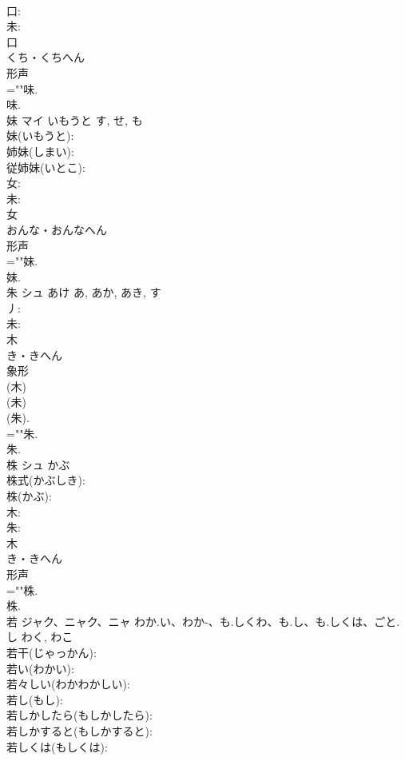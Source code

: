 \documentclass[8pt]{extreport}
\begin{document}
\begin{CJK}{UTF8}{min}
\\	口: 
\\	未: 
\\	口	
\\	くち・くちへん	
\\	形声 
\\	=""味.
\\	味.
\\	妹	マイ	いもうと	す, せ, も	
\\	妹(いもうと): 
\\	姉妹(しまい): 
\\	従姉妹(いとこ): 
\\	女: 
\\	未: 
\\	女	
\\	おんな・おんなへん	
\\	形声 
\\	=""妹.
\\	妹.
\\	朱	シュ	あけ	あ, あか, あき, す	
\\	丿: 
\\	未: 
\\	木	
\\	き・きへん	
\\	象形 
\\	(木) 
\\	(未)
\\	(朱).	
\\	=""朱.
\\	朱.
\\	株	シュ	かぶ		
\\	株式(かぶしき): 
\\	株(かぶ): 
\\	木: 
\\	朱: 
\\	木	
\\	き・きへん	
\\	形声 
\\	=""株.
\\	株.
\\	若	ジャク、ニャク、ニャ	わか.い、わか-、も.しくわ、も.し、も.しくは、ごと.し	わく, わこ	
\\	若干(じゃっかん): 
\\	若い(わかい): 
\\	若々しい(わかわかしい): 
\\	若し(もし): 
\\	若しかしたら(もしかしたら): 
\\	若しかすると(もしかすると): 
\\	若しくは(もしくは): 

\end{CJK}
\end{document}

